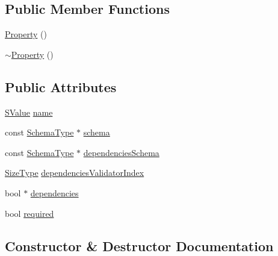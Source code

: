 \subsection*{Public Member Functions}
\begin{DoxyCompactItemize}
\item 
\hyperlink{structinternal_1_1Schema_1_1Property_ad82c2b27ac45b33460cfb78873f90de2}{Property} ()
\item 
\hyperlink{structinternal_1_1Schema_1_1Property_a801cac647ec64cc4dd4851d1c7613803}{$\sim$\+Property} ()
\end{DoxyCompactItemize}
\subsection*{Public Attributes}
\begin{DoxyCompactItemize}
\item 
\hyperlink{classinternal_1_1Schema_ab3a07540a27d4cc2b0e260290c5c5771}{S\+Value} \hyperlink{structinternal_1_1Schema_1_1Property_ace21cf3e96710639f11dba3e3d011670}{name}
\item 
const \hyperlink{classinternal_1_1Schema_ac2556ebf7a7db971e1c1c0f76eb5786e}{Schema\+Type} $\ast$ \hyperlink{structinternal_1_1Schema_1_1Property_a8f152cf4f0ea5418a4fb3bf4c3746eb7}{schema}
\item 
const \hyperlink{classinternal_1_1Schema_ac2556ebf7a7db971e1c1c0f76eb5786e}{Schema\+Type} $\ast$ \hyperlink{structinternal_1_1Schema_1_1Property_a422e3f9c2fad29f3f8c3ce3be01430ab}{dependencies\+Schema}
\item 
\hyperlink{rapidjson_8h_a5ed6e6e67250fadbd041127e6386dcb5}{Size\+Type} \hyperlink{structinternal_1_1Schema_1_1Property_a8fe17f87aa205e912f3769873168224a}{dependencies\+Validator\+Index}
\item 
bool $\ast$ \hyperlink{structinternal_1_1Schema_1_1Property_a942c0457543b8ee3fdda3fbb29fc4598}{dependencies}
\item 
bool \hyperlink{structinternal_1_1Schema_1_1Property_a48dd761e20145ea74129c0d4fad5e1d4}{required}
\end{DoxyCompactItemize}


\subsection{Constructor \& Destructor Documentation}
\mbox{\label{structinternal_1_1Schema_1_1Property_ad82c2b27ac45b33460cfb78873f90de2}} 
